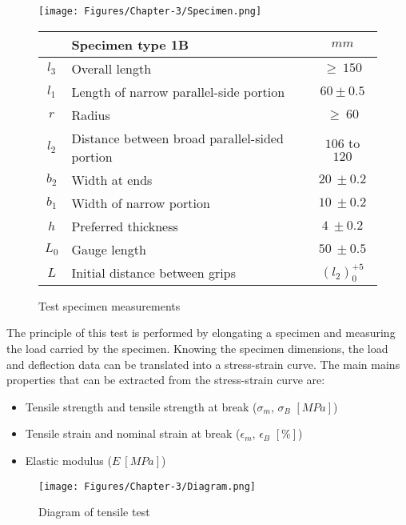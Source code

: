 \begin{figure} [H]
	\centering
	\texttt{[image: Figures/Chapter-3/Specimen.png]}
	\medskip
	\begin{tabular}[b]{clc}
		\toprule
		& \textbf{Specimen type 1B} & $mm$ \\
		\midrule
		$l_{3}$ & Overall length  &$\geqslant~150$ \\
		$l_{1}$ & Length of narrow parallel-side portion & $60 \pm0.5$ \\
		$r$	& Radius  &	$\geqslant~60$	\\
		$l_{2}$	& Distance between broad parallel-sided portion  &	$106$ to $120$	\\
		$b_{2}$ & Width at ends & $20~\pm0.2$ \\
		$b_{1}$ & Width of narrow portion & $10~\pm0.2$ \\
		$h$ & Preferred thickness & $4~\pm0.2$ \\
		$L_{0}$ & Gauge length & $50~\pm0.5$ \\
		$L$ & Initial distance between grips & $(l_{2})_{0}^{+5}$\\
		\bottomrule
	\end{tabular}
	\caption{Test specimen measurements}
	\label{specimen.measures}
\end{figure}


The principle of this test is performed by elongating a specimen and measuring the load carried by the specimen.
Knowing the specimen dimensions, the load and deflection data can be translated into a stress-strain curve.
The main mains properties that can be extracted from the stress-strain curve are:

\begin{itemize}[noitemsep]
	\item Tensile strength and tensile strength at break ($\sigma_{m}$, $\sigma_{B}$ $[MPa]$)
	\item Tensile strain and nominal strain at break ($\epsilon_{m}$, $\epsilon_{B}$ $[\%]$)
	\item Elastic modulus ($E~[MPa]$)
\end{itemize}


\begin{figure} [H]
	\centering
	\texttt{[image: Figures/Chapter-3/Diagram.png]}
	\caption{Diagram of tensile test}
	\label{mechanical.diagram}
\end{figure}

